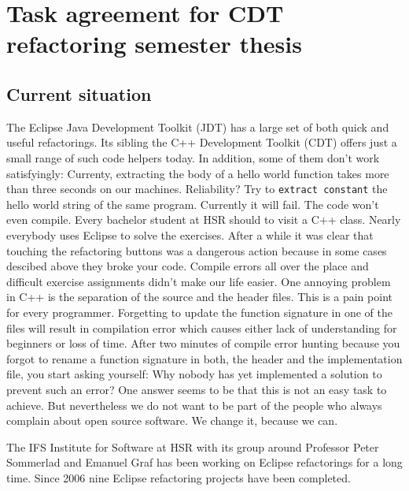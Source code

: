 \documentclass[a4paper,12pt]{scrreprt}
\begin{document}
\section*{Task agreement for CDT refactoring semester thesis}

\subsection*{Current situation}

The Eclipse Java Development Toolkit (JDT) has a large set of both quick and
useful refactorings. Its sibling the C++ Development Toolkit (CDT) offers just a
small range of such code helpers today. In addition, some of them don't work
satisfyingly: Currenty, extracting the body of a hello world function takes more than
three seconds on our machines. Reliability? Try to \texttt{extract constant} the
hello world string of the same program. Currently it will fail. The code won't even
compile.\newline
Every bachelor student at HSR should to visit a C++ class. Nearly
everybody uses Eclipse to solve the exercises. After a while it was clear that
touching the refactoring buttons was a dangerous action because in some cases
descibed above they broke your code. Compile errors all over the place and
difficult exercise assignments didn't make our life easier.\newline
One annoying problem in C++ is the separation of the source and the header
files. This is a pain point for every programmer. Forgetting to update the
function signature in one of the files will result in compilation error which
causes either lack of understanding for beginners or loss of time.\newline
After two minutes of compile error hunting because you forgot to rename a
function signature in both, the header and the implementation file, you start
asking yourself: Why nobody has yet implemented a solution to prevent such an
error?\newline
One answer seems to be that this is not an easy task to achieve. But
nevertheless we do not want to be part of the people who always complain about
open source software. We change it, because we can. \newline
 
The IFS Institute for Software at HSR with its group around Professor Peter Sommerlad and
Emanuel Graf has been working on Eclipse refactorings for a long time. Since
2006 nine Eclipse refactoring projects have been completed.\newline
\end{document}
